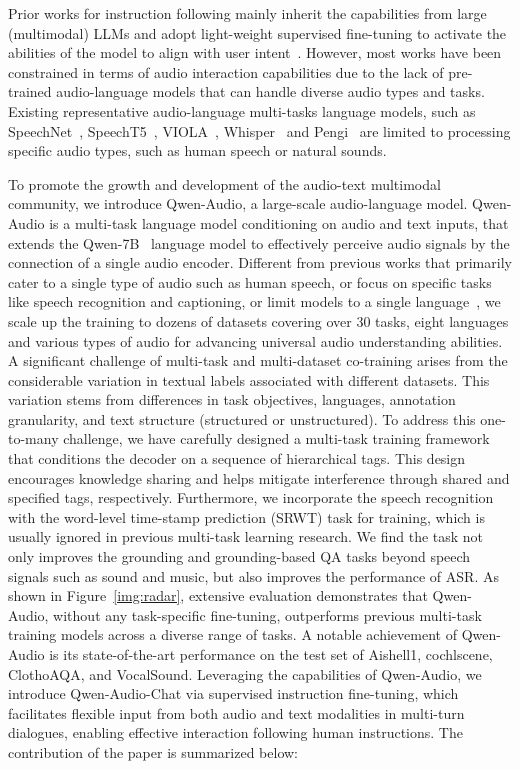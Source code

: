 \documentclass{article}
\begin{document}
Prior works for instruction following mainly inherit the capabilities from large (multimodal) LLMs and adopt light-weight supervised fine-tuning to activate the abilities of the model to align with user intent~\citep{ouyang2022intructgpt, wang2023blsp, LTU}. However, most works have been constrained in terms of audio interaction capabilities due to the lack of  pre-trained audio-language models that can handle diverse audio types and tasks. Existing representative audio-language multi-tasks language models, such as SpeechNet~\citep{chen2021speechnet}, SpeechT5~\citep{ao2021speecht5}, VIOLA~\citep{VIOLA}, Whisper~\citep{Whisper} and Pengi~\citep{Pengi} are limited to processing specific audio types, such as human speech or natural sounds.


To promote the growth and development of the audio-text multimodal community, we introduce Qwen-Audio, a large-scale audio-language model. Qwen-Audio is a multi-task language model conditioning on audio and text inputs, that extends the Qwen-7B~\citep{bai2023qwen} language model to effectively perceive audio signals by the connection of a single audio encoder. Different from previous works that primarily cater to a single type of audio such as human speech, or focus on specific tasks like speech recognition and captioning, or limit models to a single language~\citep{wang2023blsp, Macaw-LLM, NextGPT, LTU, shu2023llasm}, we scale up the training to dozens of datasets covering over 30 tasks, eight languages and various types of audio for advancing universal audio understanding abilities. A significant challenge of multi-task and multi-dataset co-training arises from the considerable variation in textual labels associated with different datasets. This variation stems from differences in task objectives, languages, annotation granularity, and text structure (structured or unstructured). To address this one-to-many challenge, we have carefully designed a multi-task training framework that conditions the decoder on a sequence of hierarchical tags. This design encourages knowledge sharing and helps mitigate interference through shared and specified tags, respectively. Furthermore, we incorporate the speech recognition with the word-level time-stamp prediction (SRWT) task for training, which is usually ignored in previous multi-task learning research. We find the task not only improves the grounding and grounding-based QA tasks beyond speech signals such as sound and music, but also improves the performance of ASR. As shown in Figure~\ref{img:radar}, extensive evaluation demonstrates that Qwen-Audio, without any task-specific fine-tuning, outperforms previous multi-task training models across a diverse range of tasks. A notable achievement of Qwen-Audio is its state-of-the-art performance on the test set of Aishell1, cochlscene, ClothoAQA, and VocalSound. Leveraging the capabilities of Qwen-Audio, we introduce Qwen-Audio-Chat via supervised instruction fine-tuning, which facilitates flexible input from both audio and text modalities in multi-turn dialogues, enabling effective interaction following human instructions. The contribution of the paper is summarized below:
\end{document}
